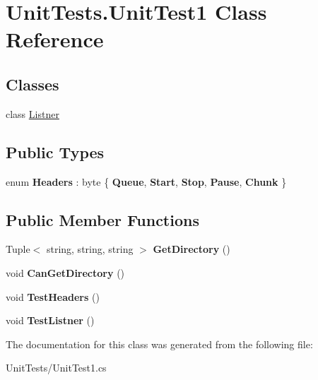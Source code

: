 \hypertarget{class_unit_tests_1_1_unit_test1}{}\section{Unit\+Tests.\+Unit\+Test1 Class Reference}
\label{class_unit_tests_1_1_unit_test1}
\subsection*{Classes}
\begin{DoxyCompactItemize}
\item 
class \hyperlink{class_unit_tests_1_1_unit_test1_1_1_listner}{Listner}
\end{DoxyCompactItemize}
\subsection*{Public Types}
\begin{DoxyCompactItemize}
\item 
\mbox{\label{class_unit_tests_1_1_unit_test1_a5083b91121b30575ad1d66cec6ac7d9e}} 
enum {\bfseries Headers} \+: byte \{ \newline
{\bfseries Queue}, 
{\bfseries Start}, 
{\bfseries Stop}, 
{\bfseries Pause}, 
\newline
{\bfseries Chunk}
 \}
\end{DoxyCompactItemize}
\subsection*{Public Member Functions}
\begin{DoxyCompactItemize}
\item 
\mbox{\label{class_unit_tests_1_1_unit_test1_afae8b3061fd55ce4d85dd6dc4fca9619}} 
Tuple$<$ string, string, string $>$ {\bfseries Get\+Directory} ()
\item 
\mbox{\label{class_unit_tests_1_1_unit_test1_ada6bf0484843d4a60e1dfc7ab3f3f189}} 
void {\bfseries Can\+Get\+Directory} ()
\item 
\mbox{\label{class_unit_tests_1_1_unit_test1_a0fd89858a5379844d4feb34db7c2b49f}} 
void {\bfseries Test\+Headers} ()
\item 
\mbox{\label{class_unit_tests_1_1_unit_test1_a48c489f837270d8e9a973be5ee8cf194}} 
void {\bfseries Test\+Listner} ()
\end{DoxyCompactItemize}


The documentation for this class was generated from the following file\+:\begin{DoxyCompactItemize}
\item 
Unit\+Tests/Unit\+Test1.\+cs\end{DoxyCompactItemize}

